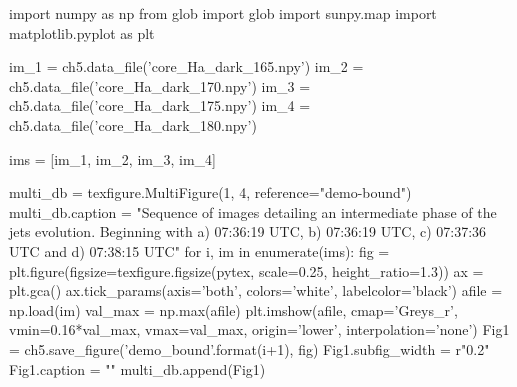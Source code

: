 \begin{pycode}[chapter5]
import numpy as np
from glob import glob
import sunpy.map
import matplotlib.pyplot as plt

im_1 = ch5.data_file('core_Ha_dark_165.npy')
im_2 = ch5.data_file('core_Ha_dark_170.npy')
im_3 = ch5.data_file('core_Ha_dark_175.npy')
im_4 = ch5.data_file('core_Ha_dark_180.npy')

ims = [im_1, im_2, im_3, im_4]

multi_db = texfigure.MultiFigure(1, 4, reference="demo-bound")
multi_db.caption = "Sequence of images detailing an intermediate phase of the jets evolution. Beginning with a) 07:36:19 UTC, b) 07:36:19 UTC, c) 07:37:36 UTC and d) 07:38:15 UTC"
for i, im in enumerate(ims):
	fig = plt.figure(figsize=texfigure.figsize(pytex, scale=0.25, height_ratio=1.3))
	ax = plt.gca()
	ax.tick_params(axis='both', colors='white', labelcolor='black')
	afile = np.load(im)
	val_max = np.max(afile)
	plt.imshow(afile, cmap='Greys_r', vmin=0.16*val_max, vmax=val_max, origin='lower', interpolation='none')
	Fig1 = ch5.save_figure('demo_bound{}'.format(i+1), fig)
	Fig1.subfig_width = r"0.2\textwidth"
	Fig1.caption = ""
	multi_db.append(Fig1)

\end{pycode}

